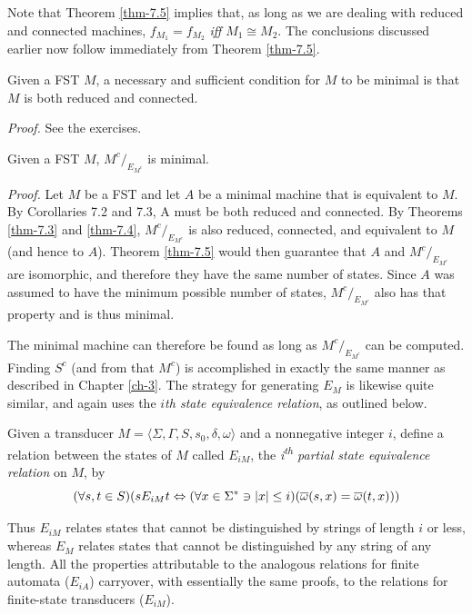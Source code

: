 Note that Theorem \ref{thm-7.5} implies that, as long as we are dealing with reduced and
connected machines, $f_{M_1}=f_{M_2}$ \emph{iff} $M_1 \cong M_2$. The conclusions
discussed earlier now follow immediately from Theorem \ref{thm-7.5}.

\begin{cor}\label{cor-7.4}
Given a FST $M$, a necessary and sufficient condition for $M$ to be minimal is
that $M$ is both reduced and connected.

\emph{Proof.} See the exercises.
\end{cor}

\begin{cor}\label{cor-7.5}
Given a FST $M$, $M^c /  _{E_{M^c}}$ is minimal.

\emph{Proof.} Let $M$ be a FST and let $A$ be a minimal machine that is
equivalent to $M$. By Corollaries 7.2 and 7.3, A must be both reduced and
connected. By Theorems \ref{thm-7.3} and \ref{thm-7.4}, $M^c /  _{E_{M^c}}$ is also reduced, connected,
and equivalent to $M$ (and hence to $A$). Theorem \ref{thm-7.5} would then guarantee that
$A$ and $M^c /  _{E_{M^c}}$ are isomorphic, and therefore they have the same number
of states. Since $A$ was assumed to have the minimum possible number of states,
$M^c /  _{E_{M^c}}$ also has that property and is thus minimal.
\end{cor}

The minimal machine can therefore be found as long as $M^c /  _{E_{M^c}}$ can be
computed. Finding $S^c$ (and from that $M^c$) is accomplished in exactly the
same manner as described in Chapter \ref{ch-3}. The strategy for generating $E_M$ is
likewise quite similar, and again uses the \emph{$i$th state equivalence
relation}, as outlined below.

\begin{dfn}\label{dfn-7.15}
Given a transducer $M=\langle\Sigma,\Gamma,S,s_0,\delta,\omega\rangle$ and a
nonnegative integer $i$, define a relation between the states of $M$ called
$E_{iM}$, the \emph{i\textsuperscript{th} partial state equivalence relation} on $M$, by
\[ (\forall s,t \in S)(s E_{iM} t \Leftrightarrow (\forall x \in \Sigma^* \ni
	|x| \leq i)(\overline{\omega}(s,x) = \overline{\omega}(t,x))) \]
\end{dfn}

Thus $E_{iM}$ relates states that cannot be distinguished by strings of length
$i$ or less, whereas $E_M$ relates states that cannot be distinguished by any
string of any length. All the properties attributable to the analogous relations
for finite automata ($E_{iA}$) carryover, with essentially the same proofs, to
the relations for finite-state transducers ($E_{iM}$).

